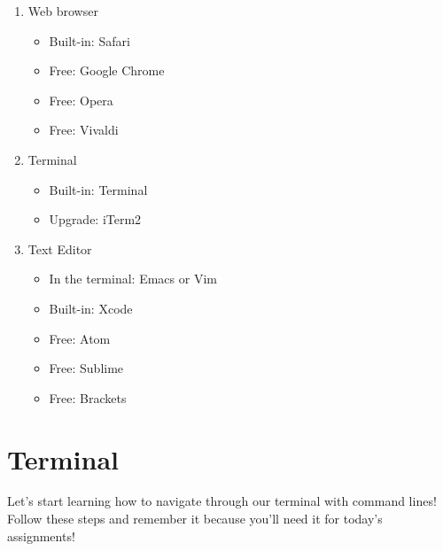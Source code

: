 \documentclass{42-en}
\begin{document}
\begin{enumerate}
	\item Web browser
	\begin{itemize}
		\item Built-in: Safari
		\item Free: Google Chrome
		\item Free: Opera
		\item Free: Vivaldi
	\end{itemize}
	\item Terminal
	\begin{itemize}
		\item Built-in: Terminal
		\item Upgrade: iTerm2
	\end{itemize}
	\item Text Editor
	\begin{itemize}
		\item In the terminal: Emacs or Vim
		\item Built-in: Xcode
		\item Free: Atom
		\item Free: Sublime
		\item Free: Brackets
	\end{itemize}
\end{enumerate}



\chapter{Terminal}

Let's start learning how to navigate through our terminal with command lines! Follow these steps and remember it because you'll need it for today's assignments! \\
\end{document}
